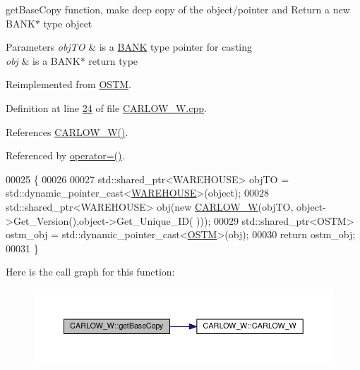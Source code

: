 get\+Base\+Copy function, make deep copy of the object/pointer and Return a new B\+A\+N\+K$\ast$ type object 


\begin{DoxyParams}{Parameters}
{\em obj\+TO} & is a \hyperlink{class_b_a_n_k}{B\+A\+NK} type pointer for casting \\
\hline
{\em obj} & is a B\+A\+N\+K$\ast$ return type \\
\hline
\end{DoxyParams}


Reimplemented from \hyperlink{class_o_s_t_m_a0bfa3763bd441407dd6365f42714f94c_a0bfa3763bd441407dd6365f42714f94c}{O\+S\+TM}.



Definition at line \hyperlink{_c_a_r_l_o_w___w_8cpp_source_l00024}{24} of file \hyperlink{_c_a_r_l_o_w___w_8cpp_source}{C\+A\+R\+L\+O\+W\+\_\+\+W.\+cpp}.



References \hyperlink{_c_a_r_l_o_w___w_8h_source_l00024}{C\+A\+R\+L\+O\+W\+\_\+\+W()}.



Referenced by \hyperlink{_c_a_r_l_o_w___w_8h_source_l00075}{operator=()}.


\begin{DoxyCode}
00025 \{
00026 
00027     std::shared\_ptr<WAREHOUSE> objTO = std::dynamic\_pointer\_cast<\hyperlink{class_w_a_r_e_h_o_u_s_e}{WAREHOUSE}>(object);
00028     std::shared\_ptr<WAREHOUSE> obj(\textcolor{keyword}{new} \hyperlink{class_c_a_r_l_o_w___w_a8ae6ca6f4db7ea5240322fd27824c55a_a8ae6ca6f4db7ea5240322fd27824c55a}{CARLOW\_W}(objTO, object->Get\_Version(),\textcolor{keywordtype}{object}->Get\_Unique\_ID(
      )));
00029     std::shared\_ptr<OSTM> ostm\_obj = std::dynamic\_pointer\_cast<\hyperlink{class_o_s_t_m}{OSTM}>(obj);
00030     \textcolor{keywordflow}{return} ostm\_obj;
00031 \}
\end{DoxyCode}


Here is the call graph for this function\+:\nopagebreak
\begin{figure}[H]
\begin{center}
\leavevmode
\includegraphics[width=350pt]{class_c_a_r_l_o_w___w_a1a76566c3a7c01cf469007741dac6b97_a1a76566c3a7c01cf469007741dac6b97_cgraph}
\end{center}
\end{figure}


